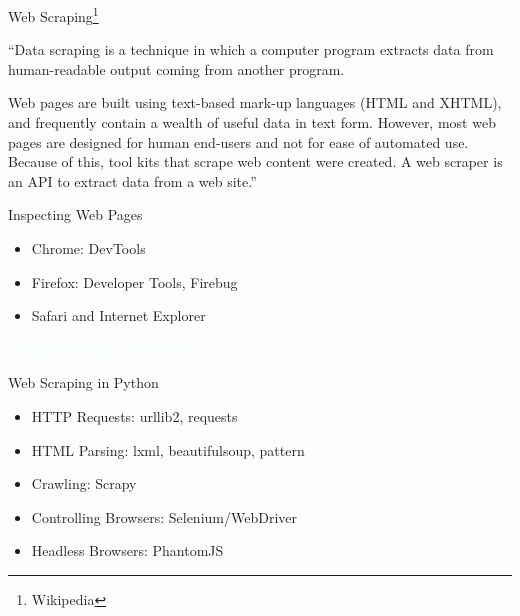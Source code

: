 \documentclass{beamer}
\newcommand{\thblue}[1]{{\Huge {\textcolor{azure}{#1}}}}
\begin{document}
\begin{frame}{Web Scraping\footnote{Wikipedia}}
    \begin{center}  
        ``Data scraping is a technique in which a computer program extracts data from human-readable output coming from another program.

        Web pages are built using text-based mark-up languages (HTML and XHTML), and frequently contain a wealth of useful data in text form.  However, most web pages are designed for human end-users and not for ease of automated use.  Because of this, tool kits that scrape web content were created. A web scraper is an API to extract data from a web site.'' 
    \end{center}
\end{frame}


\begin{frame}{Inspecting Web Pages}
    \begin{itemize}
        \item Chrome: DevTools 
        \item Firefox: Developer Tools, Firebug
        \item Safari and Internet Explorer
    \end{itemize}
\end{frame}

\begin{frame}{} 
    \begin{center}
        \thblue{Chrome Developer Tools Demo}
    \end{center}
\end{frame}

\begin{frame}{Web Scraping in Python}
    \begin{itemize}
        \item HTTP Requests: urllib2, requests
        \item HTML Parsing: lxml, beautifulsoup, pattern
        \item Crawling: Scrapy
        \item Controlling Browsers: Selenium/WebDriver
        \item Headless Browsers: PhantomJS
    \end{itemize}
\end{frame}
\end{document}
